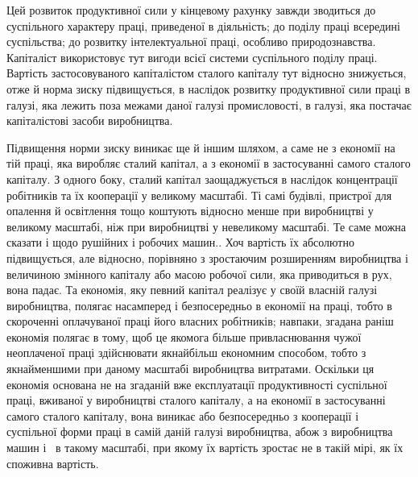 \parcont{}  %
Цей розвиток продуктивної сили у кінцевому рахунку завжди
зводиться до суспільного характеру праці, приведеної в діяльність;
до поділу праці всередині суспільства; до розвитку інтелектуальної
праці, особливо природознавства. Капіталіст використовує
тут вигоди всієї системи суспільного поділу праці.
Вартість застосовуваного капіталістом сталого капіталу тут
відносно знижується, отже й норма зиску підвищується, в наслідок
розвитку продуктивної сили праці в галузі, яка лежить
поза межами даної галузі промисловості, в галузі, яка постачає
капіталістові засоби виробництва.

Підвищення норми зиску виникає ще й іншим шляхом, а саме
не з економії на тій праці, яка виробляє сталий капітал, а з економії
в застосуванні самого сталого капіталу. З одного боку,
сталий капітал заощаджується в наслідок концентрації робітників
та їх кооперації у великому масштабі. Ті самі будівлі, пристрої
для опалення й освітлення тощо коштують відносно
менше при виробництві у великому масштабі, ніж при виробництві
у невеликому масштабі. Те саме можна сказати і щодо
рушійних і робочих машин.. Хоч вартість їх абсолютно підвищується,
але відносно, порівняно з зростаючим розширенням
виробництва і величиною змінного капіталу або масою робочої
сили, яка приводиться в рух, вона падає. Та економія, яку певний
капітал реалізує у своїй власній галузі виробництва, полягає
насамперед і безпосередньо в економії на праці, тобто в скороченні
оплачуваної праці його власних робітників; навпаки, згадана
раніш економія полягає в тому, щоб це якомога більше привласнювання
чужої неоплаченої праці здійснювати якнайбільш економним
способом, тобто з якнайменшими при даному масштабі
виробництва витратами. Оскільки ця економія основана не
на згаданій вже експлуатації продуктивності суспільної праці,
вживаної у виробництві сталого капіталу, а на економії в застосуванні
самого сталого капіталу, вона виникає або безпосередньо
з кооперації і суспільної форми праці в самій даній галузі виробництва,
абож з виробництва машин і~ в такому масштабі,
при якому їх вартість зростає не в такій мірі, як їх споживна
вартість.


